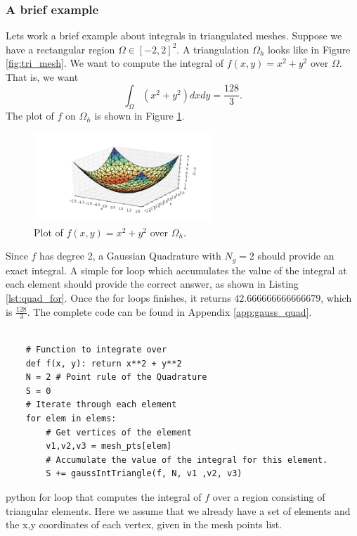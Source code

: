 \documentclass{uonmathreport}
\begin{document}
\subsubsection{A brief example}
Lets work a brief example about integrals in triangulated meshes. Suppose we have a rectangular region $\Omega \in [-2,2]^2$. A triangulation $\Omega_h$ looks like in Figure \ref{fig:tri_mesh}. We want to compute the integral of $f(x,y) = x^2 + y^2$ over $\Omega$. That is, we want
\begin{equation}
\int_{\Omega} (x^2 + y^2) dxdy = \frac{128}{3}.
\end{equation}
The plot of $f$ on $\Omega_h$ is shown in Figure \ref{fig:f_tri_mesh}.

\begin{figure}[H]
	\begin{center}
		\includegraphics[width=0.6\textwidth]{Figures/f_tri_mesh.png}
	\end{center}
	\caption{Plot of $f(x,y) = x^2 + y^2$ over $\Omega_h$.}
	\label{fig:f_tri_mesh}
\end{figure}

Since $f$ has degree 2, a Gaussian Quadrature with $N_g=2$ should provide an exact integral. A simple for loop which accumulates the value of the integral at each element should provide the correct answer, as shown in Listing \ref{lst:quad_for}. Once the for loops finishes, it returns $42.666666666666679$, which is $\frac{128}{3}$. The complete code can be found in Appendix \ref{app:gauss_quad}.

\begin{listing}[H]
	\centering
\begin{verbatim}
	
	# Function to integrate over 
	def f(x, y): return x**2 + y**2
	N = 2 # Point rule of the Quadrature
	S = 0
	# Iterate through each element
	for elem in elems:
		# Get vertices of the element
		v1,v2,v3 = mesh_pts[elem]
		# Accumulate the value of the integral for this element.
		S += gaussIntTriangle(f, N, v1 ,v2, v3)
\end{verbatim}
\caption{python for loop that computes the integral of $f$ over a region consisting of triangular elements. Here we assume that we already have a set of elements and the x,y coordinates of each vertex, given in the mesh points list.}
\label{lst:quad_for}
\end{listing}
\end{document}
